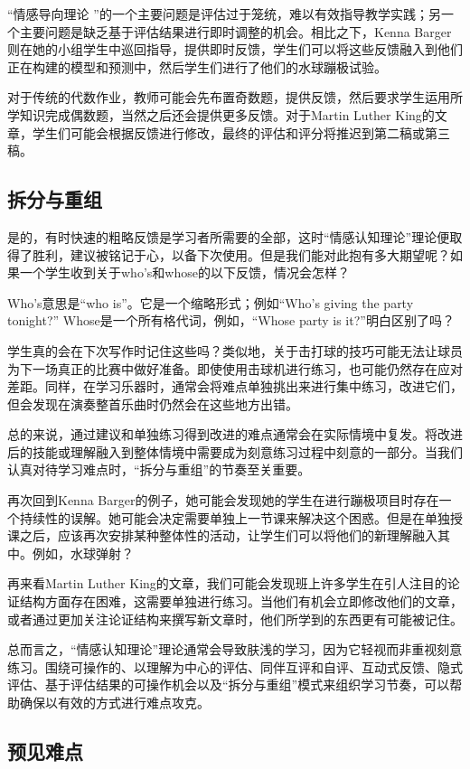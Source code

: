“情感导向理论 ”的一个主要问题是评估过于笼统，难以有效指导教学实践；另一个主要问题是缺乏基于评估结果进行即时调整的机会。相比之下，Kenna Barger则在她的小组学生中巡回指导，提供即时反馈，学生们可以将这些反馈融入到他们正在构建的模型和预测中，然后学生们进行了他们的水球蹦极试验。

对于传统的代数作业，教师可能会先布置奇数题，提供反馈，然后要求学生运用所学知识完成偶数题，当然之后还会提供更多反馈。对于Martin Luther King的文章，学生们可能会根据反馈进行修改，最终的评估和评分将推迟到第二稿或第三稿。

\subsection*{拆分与重组}

是的，有时快速的粗略反馈是学习者所需要的全部，这时“情感认知理论”理论便取得了胜利，建议被铭记于心，以备下次使用。但是我们能对此抱有多大期望呢？如果一个学生收到关于who's和whose的以下反馈，情况会怎样？

Who's意思是“who is”。它是一个缩略形式；例如“Who's giving the party tonight?” Whose是一个所有格代词，例如，“Whose party is it?”明白区别了吗？

学生真的会在下次写作时记住这些吗？类似地，关于击打球的技巧可能无法让球员为下一场真正的比赛中做好准备。即使使用击球机进行练习，也可能仍然存在应对差距。同样，在学习乐器时，通常会将难点单独挑出来进行集中练习，改进它们，但会发现在演奏整首乐曲时仍然会在这些地方出错。

总的来说，通过建议和单独练习得到改进的难点通常会在实际情境中复发。将改进后的技能或理解融入到整体情境中需要成为刻意练习过程中刻意的一部分。当我们认真对待学习难点时，“拆分与重组”的节奏至关重要。

再次回到Kenna Barger的例子，她可能会发现她的学生在进行蹦极项目时存在一个持续性的误解。她可能会决定需要单独上一节课来解决这个困惑。但是在单独授课之后，应该再次安排某种整体性的活动，让学生们可以将他们的新理解融入其中。例如，水球弹射？

再来看Martin Luther King的文章，我们可能会发现班上许多学生在引人注目的论证结构方面存在困难，这需要单独进行练习。当他们有机会立即修改他们的文章，或者通过更加关注论证结构来撰写新文章时，他们所学到的东西更有可能被记住。

总而言之，“情感认知理论”理论通常会导致肤浅的学习，因为它轻视而非重视刻意练习。围绕可操作的、以理解为中心的评估、同伴互评和自评、互动式反馈、隐式评估、基于评估结果的可操作机会以及“拆分与重组”模式来组织学习节奏，可以帮助确保以有效的方式进行难点攻克。

\subsection*{预见难点}

